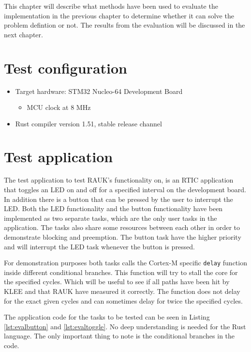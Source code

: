 This chapter will describe what methods have been used to evaluate the
implementation in the previous chapter to determine whether it can solve the
problem defintion or not. The results from the evaluation will be discussed in
the next chapter.

\section{Test configuration}
\begin{itemize}
    \item Target hardware: STM32 Nucleo-64 Development Board
    \begin{itemize}
       \item MCU clock at 8 MHz
    \end{itemize}
    \item Rust compiler version 1.51, stable release channel
\end{itemize}

\section{Test application}
The test application to test RAUK's functionality on, is an RTIC application
that toggles an LED on and off for a specified interval on the development board. In
addition there is a button that can be pressed by the user to interrupt the
LED. Both the LED functionality and the button functionality have been
implemented as two separate tasks, which are the only user tasks in the
application. The tasks also share some resources between each other in order to
demonstrate blocking and preemption. The button task have the higher priority
and will interrupt the LED task whenever the button is pressed.

For demonstration purposes both tasks calls the Cortex-M specific
\texttt{delay} function inside different conditional branches. This function
will try to stall the core for the specified cycles. Which will be useful to
see if all paths have been hit by KLEE and that RAUK have measured it correctly.
The function does not delay for the exact given cycles and can sometimes delay
for twice the specified cycles.

The application code for the tasks to be tested can be seen in Listing
\ref{lst:evalbutton} and \ref{lst:evaltoggle}. No deep understanding is
needed for the Rust language. The only important thing to note is the
conditional branches in the code.


